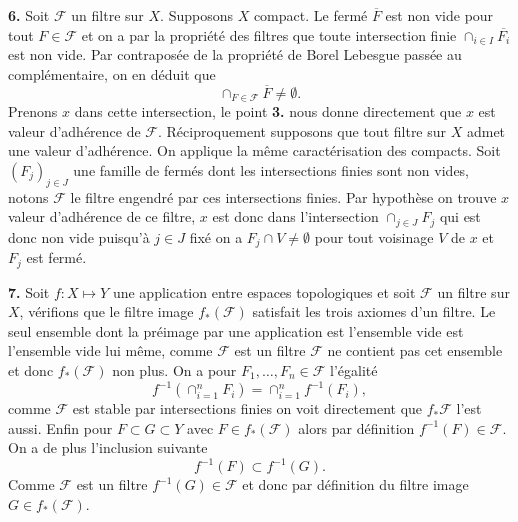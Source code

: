 \documentclass[12pt]{article}
\begin{document}
\medskip

\textbf{6.} Soit $\mathcal{F}$ un filtre sur $X$. Supposons $X$ compact. Le fermé $\overline{F}$ est non vide pour tout $F \in \mathcal{F}$ et on a par la propriété des filtres que toute intersection finie $\cap_{i \in I} \overline{F_{i}}$ est non vide. Par contraposée de la propriété de Borel Lebesgue passée au complémentaire, on en déduit que \[
\cap_{F \in \mathcal{F}}\overline{F} \neq \emptyset
.\] Prenons $x$ dans cette intersection, le point \textbf{3.} nous donne directement que $x$ est valeur d'adhérence de  $\mathcal{F}$. Réciproquement supposons que tout filtre sur $X$ admet une valeur d'adhérence. On applique la même caractérisation des compacts. Soit $(F_{j})_{j\in J}$ une famille de fermés dont les intersections finies sont non vides, notons $\mathcal{F}$ le filtre engendré par ces intersections finies. Par hypothèse on trouve $x$ valeur d'adhérence de ce filtre, $x$ est donc dans l'intersection $\cap_{j \in J}F_{j}$ qui est donc non vide puisqu'à $j \in J$ fixé on a $F_{j} \cap V \neq \emptyset$ pour tout voisinage $V$ de $x$ et $F_{j}$ est fermé.

\medskip

\textbf{7.} Soit $f : X \longmapsto Y$ une application entre espaces topologiques et soit $\mathcal{F}$ un filtre sur $X$, vérifions que le filtre image $f_{*}(\mathcal{F})$ satisfait les trois axiomes d'un filtre. Le seul ensemble dont la préimage par une application est l'ensemble vide est l'ensemble vide lui même, comme $\mathcal{F}$ est un filtre $\mathcal{F}$ ne contient pas cet ensemble et donc $f_{*}(\mathcal{F})$ non plus. On a pour $F_1, \ldots, F_{n} \in \mathcal{F}$ l'égalité \[
        f^{-1}(\cap_{i = 1}^{n} F_{i}) = \cap_{i = 1}^{n}f^{-1}(F_{i})
,\] comme $\mathcal{F}$ est stable par intersections finies on voit directement que $f_{*}\mathcal{F}$  l'est aussi. Enfin pour $F \subset G \subset Y$ avec $F \in f_{*}(\mathcal{F})$ alors par définition $f^{-1}(F) \in \mathcal{F}$. On a de plus l'inclusion suivante \[
f^{-1}(F) \subset f^{-1}(G)
.\] Comme $\mathcal{F}$ est un filtre $f^{-1}(G) \in \mathcal{F}$ et donc par définition du filtre image $G \in f_{*}(\mathcal{F})$. 

\medskip
\end{document}
